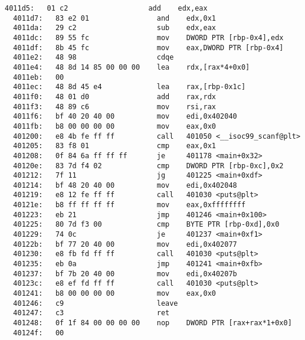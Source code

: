 \documentclass{article}
\begin{document}
\begin{lstlisting}[style=customasm, title={Program1: main }, label=program1]
  4011d5:	01 c2                	add    edx,eax
  4011d7:	83 e2 01             	and    edx,0x1
  4011da:	29 c2                	sub    edx,eax
  4011dc:	89 55 fc             	mov    DWORD PTR [rbp-0x4],edx
  4011df:	8b 45 fc             	mov    eax,DWORD PTR [rbp-0x4]
  4011e2:	48 98                	cdqe
  4011e4:	48 8d 14 85 00 00 00 	lea    rdx,[rax*4+0x0]
  4011eb:	00 
  4011ec:	48 8d 45 e4          	lea    rax,[rbp-0x1c]
  4011f0:	48 01 d0             	add    rax,rdx
  4011f3:	48 89 c6             	mov    rsi,rax
  4011f6:	bf 40 20 40 00       	mov    edi,0x402040
  4011fb:	b8 00 00 00 00       	mov    eax,0x0
  401200:	e8 4b fe ff ff       	call   401050 <__isoc99_scanf@plt>
  401205:	83 f8 01             	cmp    eax,0x1
  401208:	0f 84 6a ff ff ff    	je     401178 <main+0x32>
  40120e:	83 7d f4 02          	cmp    DWORD PTR [rbp-0xc],0x2
  401212:	7f 11                	jg     401225 <main+0xdf>
  401214:	bf 48 20 40 00       	mov    edi,0x402048
  401219:	e8 12 fe ff ff       	call   401030 <puts@plt>
  40121e:	b8 ff ff ff ff       	mov    eax,0xffffffff
  401223:	eb 21                	jmp    401246 <main+0x100>
  401225:	80 7d f3 00          	cmp    BYTE PTR [rbp-0xd],0x0
  401229:	74 0c                	je     401237 <main+0xf1>
  40122b:	bf 77 20 40 00       	mov    edi,0x402077
  401230:	e8 fb fd ff ff       	call   401030 <puts@plt>
  401235:	eb 0a                	jmp    401241 <main+0xfb>
  401237:	bf 7b 20 40 00       	mov    edi,0x40207b
  40123c:	e8 ef fd ff ff       	call   401030 <puts@plt>
  401241:	b8 00 00 00 00       	mov    eax,0x0
  401246:	c9                   	leave  
  401247:	c3                   	ret    
  401248:	0f 1f 84 00 00 00 00 	nop    DWORD PTR [rax+rax*1+0x0]
  40124f:	00 

\end{lstlisting}
\end{document}
